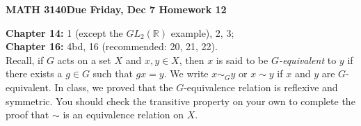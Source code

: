 \documentclass[12pt,reqno]{amsart}
\newcommand{\<}{\ensuremath{\langle}}
\renewcommand{\>}{\ensuremath{\rangle}}
\newcommand{\boldemph}{\emph}
\newcommand{\subject}{MATH\xspace}
\newcommand{\coursenumber}{3140\xspace}
\newcommand{\duedate}{Friday, Dec 7}
\begin{document}
\thispagestyle{empty}

\noindent \textbf{\subject \coursenumber \hfill {\bf Due} \duedate
 \hfill Homework 12}

\smallskip
{} {\bf Chapter 14:} 1 (except the $GL_2( {\mathbb R} )$
example), 2, 3;\\  %
 {\bf Chapter 16:} 4bd, 16 (recommended: 20, 21, 22).\\

Recall, if $G$ acts on a set $X$ and $x, y \in X$, then $x$ is said
to be \boldemph{$G$-equivalent} to $y$ if there exists a $g \in G$ such that 
$gx =y$. We  write $x \sim_G y$ or $x \sim y$ if $x$ and $y$ are $G$-equivalent. 
In class, we proved that the $G$-equivalence relation is reflexive and
symmetric. You should check the transitive property on your own to complete the
proof that $\sim$ is an equivalence relation on $X$. 
 
\end{document}

